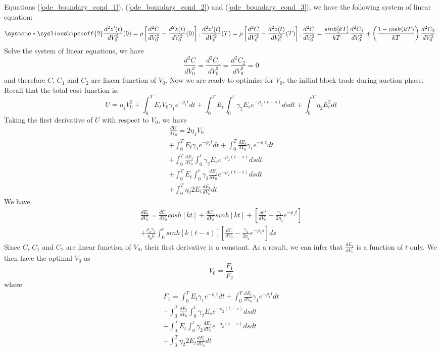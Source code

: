\documentclass{article}
\begin{document}
Equations (\ref{ode_boundary_cond_1}), (\ref{ode_boundary_cond_2}) and (\ref{ode_boundary_cond_3}), we have the following system of linear equation:
\[
  \systeme*{
    \syslineskipcoeff{2}
    \frac{d^2z'(t)}{dV_0^2}(0) = \rho\left[ \frac{d^2C}{dV_0^2} - \frac{d^2z(t)}{dV_0^2}(0) \right],
    \frac{d^2z'(t)}{dV_0^2}(T) = \rho\left[ \frac{d^2C}{dV_0^2} - \frac{d^2z(t)}{dV_0^2}(T) \right],
    \frac{d^2C}{dV_0^2} = \frac{sinh[kT]}{kT} \frac{d^2C_1}{dV_0^2} + \left(\frac{1-cosh(kT)}{kT}\right)\frac{d^2C_2}{dV_0^2}
  }.
\]
Solve the system of linear equations, we have
\[
  \frac{d^2C}{dV_0^2} =  \frac{d^2C_1}{dV_0^2} =  \frac{d^2C_2}{dV_0^2} = 0
\]
and therefore $C$, $C_1$ and $C_2$ are linear function of $V_0$. Now we are ready to optimize for $V_0$, the initial block trade during auction phase. Recall that the total cost function is:
\[
  U = \eta_1 V_0^2  + \int_0^T E_t V_0 \gamma_1 e^{-\rho_1 t} dt + \int_0^T E_t \int_0^t  \gamma_2 E_s e^{-\rho_2 (t-s)} ds dt  + \int_0^T \eta_2 E_t^2 dt
\]
Taking the first derivative of $U$ with respect to $V_0$, we have
\[
  \begin{aligned}
    \frac{dU}{dV_0} = 2 \eta_1 V_0                                                                  \\
    + \int_0^T E_t \gamma_1 e^{-\rho_1 t} dt + \int_0^T \frac{dE_t}{dV_0} \gamma_1 e^{-\rho_1 t} dt \\
    + \int_0^T \frac{dE_t}{dV_0} \int_0^t  \gamma_2 E_s e^{-\rho_2(t-s)} ds dt                      \\
    + \int_0^T E_t \int_0^t  \gamma_2 \frac{dE_s}{dV_0} e^{-\rho_2(t-s)} ds dt                      \\
    + \int_0^T \eta_2 2 E_t \frac{dE_t}{dV_0} dt
  \end{aligned}
\]
We have
\[
  \begin{aligned}
    \frac{dE_t}{dV_0} = \frac{dC_1}{dV_0} cosh[k t]+ \frac{dC_2}{dV_0}  sinh[k t] + [\frac{dC}{dV_0} - \frac{\gamma_1}{2 \eta_2} e^{-\rho_1 t}] \\
    + \frac{\rho_2 \gamma_2}{\eta_2 k}\int_0^t sinh[k(t-s)] [\frac{dC}{dV_0}- \frac{\gamma_1}{2 \eta_2} e^{-\rho_1 s}]ds
  \end{aligned}
\]
Since $C$, $C_1$ and $C_2$ are linear function of $V_0$, their first derivative is a constant. As a result, we can infer that $\frac{dE_t}{dV_0}$ is a function of $t$ only. We then have the optimal $V_0$ as
\[
  V_0 = \frac{F_1}{F_2}
\]
where
\[
  \begin{aligned}
    F_1 =  \int_0^T E_t \gamma_1 e^{-\rho_1 t} dt + \int_0^T \frac{dE_t}{dV_0} \gamma_1 e^{-\rho_1 t} dt \\
    + \int_0^T \frac{dE_t}{dV_0} \int_0^t  \gamma_2 E_s e^{-\rho_2(t-s)} ds dt                           \\
    + \int_0^T E_t \int_0^t  \gamma_2 \frac{dE_s}{dV_0} e^{-\rho_2(t-s)} ds dt                           \\
    + \int_0^T \eta_2 2 E_t \frac{dE_t}{dV_0} dt
  \end{aligned}
\]
\end{document}
